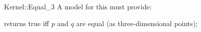 \begin{ccRefFunctionObjectConcept}{Kernel::Equal_3}
A model for this must provide:


{returns true iff $p$ and $q$ are equal (as three-dimensional points);}

\end{ccRefFunctionObjectConcept}
